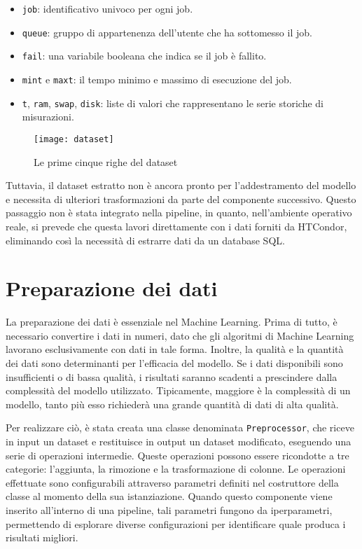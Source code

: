 \begin{itemize}
    \item \texttt{job}: identificativo univoco per ogni job.
    \item \texttt{queue}: gruppo di appartenenza dell'utente che ha sottomesso
        il job.
    \item \texttt{fail}: una variabile booleana che indica se il job è fallito.
    \item \texttt{mint} e \texttt{maxt}: il tempo minimo e massimo di
        esecuzione del job.
    \item \texttt{t}, \texttt{ram}, \texttt{swap}, \texttt{disk}: liste di
        valori che rappresentano le serie storiche di misurazioni.
\end{itemize}

\begin{figure}[!ht]
    \centering
    \texttt{[image: dataset]}
    \caption{Le prime cinque righe del dataset}
    \label{fig:dataset_from_join_hj_htjob}
\end{figure}

Tuttavia, il dataset estratto non è ancora pronto per l'addestramento del
modello e necessita di ulteriori trasformazioni da parte del componente
successivo. Questo passaggio non è stata integrato nella pipeline, in quanto,
nell'ambiente operativo reale, si prevede che questa lavori direttamente con i
dati forniti da HTCondor, eliminando così la necessità di estrarre dati da un
database SQL.

\section{Preparazione dei dati}

La preparazione dei dati è essenziale nel Machine Learning. Prima di tutto, è
necessario convertire i dati in numeri, dato che gli algoritmi di Machine
Learning lavorano esclusivamente con dati in tale forma. Inoltre, la qualità e
la quantità dei dati sono determinanti per l'efficacia del modello. Se i dati
disponibili sono insufficienti o di bassa qualità, i risultati saranno
scadenti a prescindere dalla complessità del modello utilizzato. Tipicamente,
maggiore è la complessità di un modello, tanto più esso richiederà una grande
quantità di dati di alta qualità.

Per realizzare ciò, è stata creata una classe denominata
\texttt{Preprocessor}, che riceve in input un dataset e restituisce in output
un dataset modificato, eseguendo una serie di operazioni intermedie. Queste
operazioni possono essere ricondotte a tre categorie: l'aggiunta, la rimozione
e la trasformazione di colonne. Le operazioni effettuate sono configurabili
attraverso parametri definiti nel costruttore della classe al momento della
sua istanziazione. Quando questo componente viene inserito all'interno di una
pipeline, tali parametri fungono da iperparametri, permettendo di esplorare
diverse configurazioni per identificare quale produca i risultati migliori.

